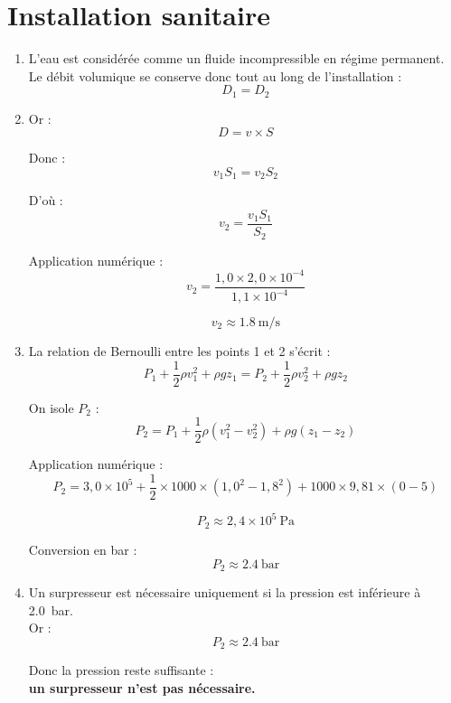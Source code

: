 \documentclass[a4paper,11pt,fleqn]{scrartcl}
\begin{document}
\maketitle

\section{Installation sanitaire}

\begin{enumerate}
    \item L'eau est considérée comme un fluide incompressible en régime permanent.\\
    Le débit volumique se conserve donc tout au long de l'installation :
    \[
    D_1 = D_2
    \]

    \item Or :
    \[
    D = v \times S
    \]

    Donc :
    \[
    v_1S_1 = v_2S_2
    \]

    D'où :
    \[
    v_2 = \dfrac{v_1S_1}{S_2}
    \]

    Application numérique :
    \[
    v_2 = \dfrac{1,0 \times 2,0\times10^{-4}}{1,1\times10^{-4}}
    \]

    \[
    v_2 \approx \SI{1,8}{\meter\per\second}
    \]

    \item La relation de Bernoulli entre les points 1 et 2 s'écrit :
    \[
    P_1 + \dfrac{1}{2}\rho v_1^2 + \rho gz_1
    =
    P_2 + \dfrac{1}{2}\rho v_2^2 + \rho gz_2
    \]

    On isole $P_2$ :
    \[
    P_2 =
    P_1 + \dfrac{1}{2}\rho(v_1^2-v_2^2)+\rho g(z_1-z_2)
    \]

    Application numérique :
    \[
    P_2 =
    3,0\times10^5
    +\dfrac{1}{2}\times1000\times(1,0^2-1,8^2)
    +1000\times9,81\times(0-5)
    \]

    \[
    P_2 \approx 2,4\times10^5\ \si{\pascal}
    \]

    Conversion en bar :
    \[
    P_2 \approx \SI{2,4}{\bar}
    \]

    \item Un surpresseur est nécessaire uniquement si la pression est inférieure à \SI{2,0}{\bar}.\\

    Or :
    \[
    P_2 \approx \SI{2,4}{\bar}
    \]

    Donc la pression reste suffisante :\\
    \textbf{un surpresseur n'est pas nécessaire.}
\end{enumerate}
\end{document}

